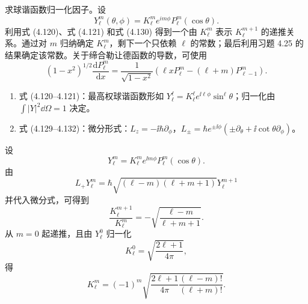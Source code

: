 \begin{question}
求球谐函数归一化因子。设
\[
Y_\ell^m(\theta,\phi)=K_\ell^m e^{im\phi}P_\ell^m(\cos\theta).
\]
利用式 (4.120)、式 (4.121) 和式 (4.130) 得到一个由 $K_\ell^m$ 表示 $K_\ell^{m+1}$ 的递推关系。通过对 $m$ 归纳确定 $K_\ell^m$，剩下一个只依赖 $\ell$ 的常数；最后利用习题 4.25 的结果确定该常数。关于缔合勒让德函数的导数，可使用
\[
(1-x^2)^{1/2}\frac{\mathrm dP_\ell^m}{\mathrm dx}=\frac{1}{\sqrt{1-x^2}}\left(\ell xP_\ell^m-(\ell+m)P_{\ell-1}^m\right).
\]

\par\smallskip
{}
\begin{enumerate}[leftmargin=2.2em,itemsep=0.12em,topsep=0.12em,parsep=0pt]
\item 式 (4.120--4.121)：最高权球谐函数形如 $Y_\ell^\ell=K_\ell^\ell e^{\ii\ell\phi}\sin^\ell\theta$；归一化由 $\int|Y|^2\dd\Omega=1$ 决定。
\item 式 (4.129--4.132)：微分形式：$L_z=-\ii\hbar\partial_\phi$，$L_\pm=\hbar e^{\pm\ii\phi}(\pm\partial_\theta+\ii\cot\theta\partial_\phi)$。
\end{enumerate}

\end{question}
\begin{solution}

设
\[
Y_\ell^m=K_\ell^m e^{\ii m\phi}P_\ell^m(\cos\theta).
\]
由
\[
L_+Y_\ell^m=\hbar\sqrt{(\ell-m)(\ell+m+1)}Y_\ell^{m+1}
\]
并代入微分式，可得到
\[
\frac{K_\ell^{m+1}}{K_\ell^m}=-\sqrt{\frac{\ell-m}{\ell+m+1}}.
\]
从 $m=0$ 起递推，且由 $Y_\ell^0$ 归一化
\[
K_\ell^0=\sqrt{\frac{2\ell+1}{4\pi}},
\]
得
\[
K_\ell^m=(-1)^m\sqrt{\frac{2\ell+1}{4\pi}\frac{(\ell-m)!}{(\ell+m)!}}.
\]

\end{solution}

